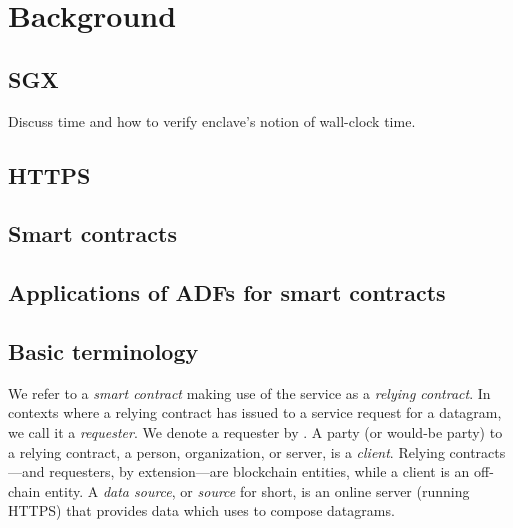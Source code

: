 \section{Background}
\subsection{SGX}

Discuss time and how to verify enclave's notion of wall-clock time.

\subsection{HTTPS}
\subsection{Smart contracts}
\subsection{Applications of ADFs for smart contracts}
\subsection{Basic terminology}
We refer to a {\em smart contract} making use of the \tcs service as a \emph{relying contract}. In contexts where a relying contract has issued to \tc a service request for a datagram, we call it a \emph{requester}. We denote a requester by \reqcont. A party (or would-be party) to a relying contract, a person, organization, or server, is a \emph{client}. Relying contracts---and requesters, by extension---are blockchain entities, while a client is an off-chain entity. A \emph{data source}, or \emph{source} for short, is an online server (running HTTPS) that provides data which \tc uses to compose datagrams.


